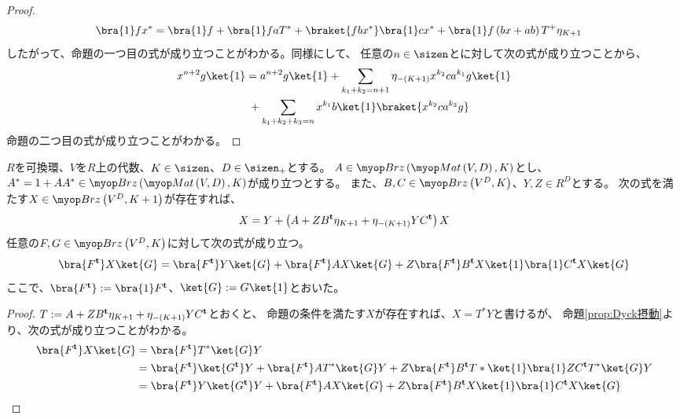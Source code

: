 {\begin{proof}
\begin{equation*}
\begin{split}
			\bra{1}fx^* &= \bra{1}f + \bra{1}faT^* + \braket{fbx^*}\bra{1}cx^*
				+ \bra{1}f\lr{bx + ab}T^+\eta_{K+1}
		\end{split}\end{equation*}
		したがって、命題の一つ目の式が成り立つことがわかる。同様にして、
		任意の$n\in\sizen$とに対して次の式が成り立つことから、
		\begin{equation*}\begin{split}
			x^{n+2}g\ket{1} &= a^{n+2}g\ket{1}
				+ \sum_{k_1+k_2=n+1} \eta_{-\lr{K+1}}x^{k_2}ca^{k_1}g\ket{1} \\
			&\;+ \sum_{k_1+k_2+k_3=n} x^{k_1}b\ket{1}\braket{x^{k_2}ca^{k_3}g}
		\end{split}\end{equation*}
		命題の二つ目の式が成り立つことがわかる。
	\end{proof} %

	\begin{proposition}[Dyck摂動その二]\label{prop:Dyck摂動その二} %
		$R$を可換環、$V$を$R$上の代数、$K\in\sizen$、$D\in\sizen_+$とする。
		$A\in\Brz\lr{\Mat\lr{V,D},K}$とし、
		$A^*=1+AA^*\in\Brz\lr{\Mat\lr{V,D},K}$が成り立つとする。
		また、$B,C\in\Brz\lr{V^D,K}$、$Y,Z\in R^D$とする。
		次の式を満たす$X\in\Brz\lr{V^D,K+1}$が存在すれば、
		\begin{equation*}\begin{split}
			X = Y + \left({A + ZB^{\mathbf{t}}\eta_{K+1} + \eta_{-\left({K+1}\right)}YC^{\mathbf{t}}}\right)X
		\end{split}\end{equation*}
		任意の$F,G\in\Brz\lr{V^D,K}$に対して次の式が成り立つ。
		\begin{equation*}\begin{split}
			\bra{F^\tran}X\ket{G} = \bra{F^\tran}Y\ket{G} + \bra{F^\tran}AX\ket{G}
				+ Z\bra{F^\tran}B^\tran X\ket{1}\bra{1}C^\tran X\ket{G} \\
		\end{split}\end{equation*}
		ここで、$\bra{F^\tran}:=\bra{1}F^\tran$、$\ket{G}:=G\ket{1}$とおいた。
	\end{proposition} %
	\begin{proof} %
		$T:=A + ZB^{\mathbf{t}}\eta_{K+1} + \eta_{-\left({K+1}\right)}YC^{\mathbf{t}}$とおくと、
		命題の条件を満たす$X$が存在すれば、$X=T^*Y$と書けるが、
		命題\ref{prop:Dyck摂動}より、次の式が成り立つことがわかる。
		\begin{equation*}\begin{split}
			\bra{F^\tran}X\ket{G} &= \bra{F^\tran}T^*\ket{G}Y \\
			&= \bra{F^\tran}\ket{G^\tran}Y + \bra{F^\tran}AT^*\ket{G}Y 
				+ Z\bra{F^\tran}B^\tran T*\ket{1}\bra{1}ZC^\tran T^*\ket{G}Y \\
			&= \bra{F^\tran}Y\ket{G^\tran}Y + \bra{F^\tran}AX\ket{G}
				+ Z\bra{F^\tran}B^\tran X\ket{1}\bra{1}C^\tran X\ket{G} \\
		\end{split}\end{equation*}
	\end{proof} %

}
